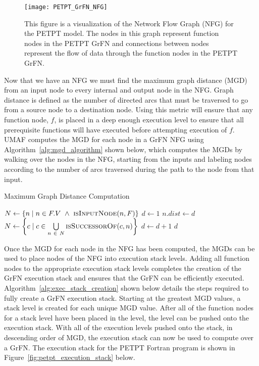 \begin{figure}[!htbp]

    \centering
    \texttt{[image: PETPT\_GrFN\_NFG]}%
    \caption[PETPT GrFN Network Flow Graph]{This figure is a visualization of the Network Flow Graph (NFG) for the PETPT model. The nodes in this graph represent function nodes in the PETPT GrFN and connections between nodes represent the flow of data through the function nodes in the PETPT GrFN.}
    \label{fig:petpt_nfg}
\end{figure}

Now that we have an NFG we must find the maximum graph distance (MGD) from an input node to every internal and output node in the NFG.
Graph distance is defined as the number of directed arcs that must be traversed to go from a source node to a destination node.
Using this metric will ensure that any function node, $f$, is placed in a deep enough execution level to ensure that all prerequisite functions will have executed before attempting execution of $f$.
UMAF computes the MGD for each node in a GrFN NFG using Algorithm~\ref{alg:mgd_algorithm} shown below, which computes the MGDs by walking over the nodes in the NFG, starting from the inputs and labeling nodes according to the number of arcs traversed during the path to the node from that input.

\begin{algorithm}
  \caption{Maximum Graph Distance Computation}
  \label{alg:mgd_algorithm}
  \begin{algorithmic}[1]
     
      \State $N \gets \{n \mid n \in F.V~\land~\Call{isInputNode}{n, F} \}$ 
      \State $d \gets 1$
          \State $n.dist \gets d$ 
        \EndFor
      	\State $N \gets \left\{ c \mid c \in \bigcup\limits_{n~\in~N}^{} \Call{isSuccessorOf}{c, n} \right\}$ 
        \State $d \gets d + 1$
      \EndWhile
      \State \Return $d$
    \EndProcedure
  \end{algorithmic}
\end{algorithm}

Once the MGD for each node in the NFG has been computed, the MGDs can be used to place nodes of the NFG into execution stack levels.
Adding all function nodes to the appropriate execution stack levels completes the creation of the GrFN execution stack and ensures that the GrFN can be efficiently executed.
Algorithm~\ref{alg:exec_stack_creation} shown below details the steps required to fully create a GrFN execution stack.
Starting at the greatest MGD values, a stack level is created for each unique MGD value.
After all of the function nodes for a stack level have been placed in the level, the level can be pushed onto the execution stack.
With all of the execution levels pushed onto the stack, in descending order of MGD, the execution stack can now be used to compute over a GrFN.
The execution stack for the PETPT Fortran program is shown in Figure~\ref{fig:petpt_execution_stack} below.

